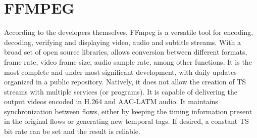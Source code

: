\documentclass[
	12pt,				%
	openright,			%
	twoside,			%
	a4paper,			%
	brazil,
	french,				%
	english
	]{abntex2}
\begin{document}


\section{FFMPEG}

According to the developers themselves, FFmpeg is a versatile tool for encoding, decoding, verifying and displaying video, audio and subtitle streams. With a broad set of open source libraries, allows conversion between different formats, frame rate, video frame size, audio sample rate, among other functions. It is the most complete and under most significant development, with daily updates organized in a public repository.
Natively, it does not allow the creation of TS streams with multiple services (or programs). It is capable of delivering the output videos encoded in H.264 and AAC-LATM audio. It maintains synchronization between flows, either by keeping the timing information present in the original flows or generating new temporal tags. If desired, a constant TS bit rate can be set and the result is reliable.
\end{document}
